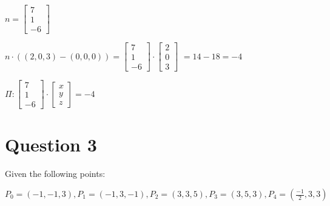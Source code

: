 \documentclass{article}
\begin{document}
\begin{enumerate}
        $n = \begin{bmatrix} 7 \\ 1 \\ -6 \end{bmatrix}$

        $n \cdot ((2, 0, 3) - (0, 0, 0)) = \begin{bmatrix} 7 \\ 1 \\ -6 \end{bmatrix} \cdot \begin{bmatrix} 2 \\ 0 \\ 3 \end{bmatrix}$
        $ = 14 - 18 = -4 $

        $\Pi : \begin{bmatrix} 7 \\ 1 \\ -6 \end{bmatrix} \cdot \begin{bmatrix} x \\ y \\ z \end{bmatrix} = -4$
        
    \end{enumerate}
    
    \section*{Question 3}
    Given the following points: 
    
    $P_0 =(-1,-1,3),P_1 =(-1,3,-1),P_2=(3,3,5),P_3=(3,5,3),P_4=(\frac{-1}{2},3,3)$
\end{document}
